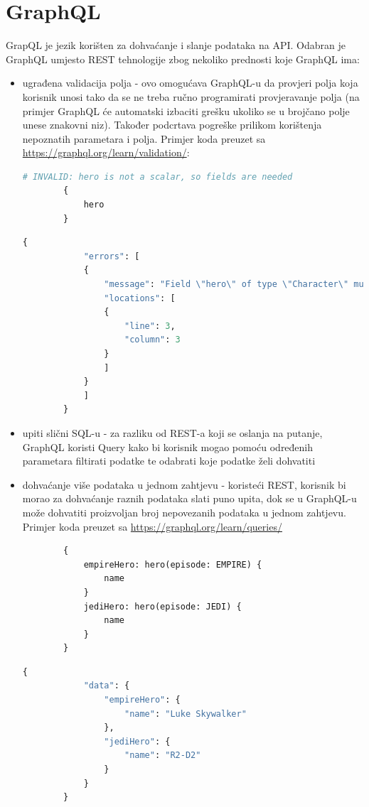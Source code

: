 \documentclass[zavrsnirad]{fer}
\begin{document}
\section{GraphQL}
GrapQL je jezik korišten za dohvaćanje i slanje podataka na API. Odabran je GraphQL umjesto REST tehnologije zbog nekoliko prednosti koje GraphQL ima:
 \begin{itemize}
 	\item ugrađena validacija polja - ovo omogućava GraphQL-u da provjeri polja koja korisnik unosi tako da se ne treba ručno programirati provjeravanje polja (na primjer GraphQL će automatski izbaciti grešku ukoliko se u brojčano polje unese znakovni niz). Također podcrtava pogreške prilikom korištenja nepoznatih parametara i polja. Primjer koda preuzet sa  \url{https://graphql.org/learn/validation/}:
 	\begin{lstlisting}[language=GraphQL]
 		# INVALID: hero is not a scalar, so fields are needed
 		{
 			hero
 		}
 	\end{lstlisting}
 	\begin{lstlisting}[language=GraphQL]
 		{
 			"errors": [
 			{
 				"message": "Field \"hero\" of type \"Character\" must have a selection of subfields. Did you mean \"hero { ... }\"?",
 				"locations": [
 				{
 					"line": 3,
 					"column": 3
 				}
 				]
 			}
 			]
 		}
 	\end{lstlisting}
 	\item upiti slični SQL-u - za razliku od REST-a koji se oslanja na putanje, GraphQL koristi Query kako bi korisnik mogao pomoću određenih parametara filtirati podatke te odabrati koje podatke želi dohvatiti
 	\item dohvaćanje više podataka u jednom zahtjevu - koristeći REST, korisnik bi morao za dohvaćanje raznih podataka slati puno upita, dok se u GraphQL-u može dohvatiti proizvoljan broj nepovezanih podataka u jednom zahtjevu. Primjer koda preuzet sa \url{https://graphql.org/learn/queries/}
 	\begin{lstlisting}
 		{
 			empireHero: hero(episode: EMPIRE) {
 				name
 			}
 			jediHero: hero(episode: JEDI) {
 				name
 			}
 		}
 	\end{lstlisting}
 	\begin{lstlisting}[language=GraphQL]
 		{
 			"data": {
 				"empireHero": {
 					"name": "Luke Skywalker"
 				},
 				"jediHero": {
 					"name": "R2-D2"
 				}
 			}
 		}
 	\end{lstlisting}
 \end{itemize}
\end{document}
